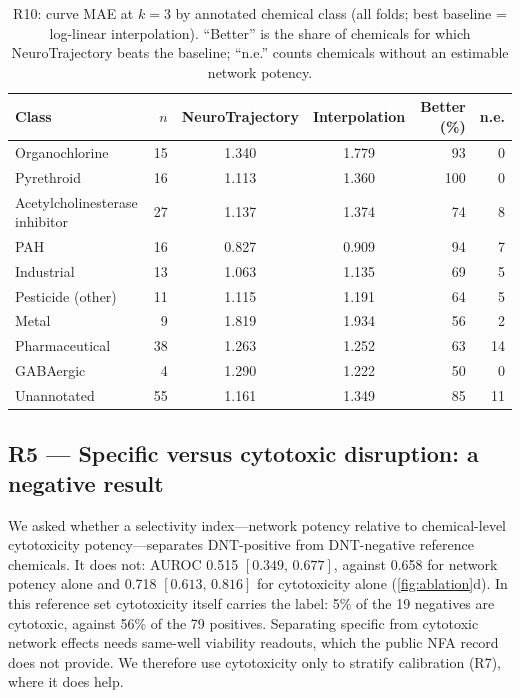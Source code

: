 \documentclass[11pt,a4paper]{article}
\newcommand{\NT}{NeuroTrajectory}
\newcommand{\ci}[2]{\ensuremath{[#1,\,#2]}}          %
\newcommand{\nPos}{79}
\newcommand{\nNeg}{19}
\begin{document}
\begin{table}[t]
\centering\footnotesize
\caption{R10: curve MAE at \(k=3\) by annotated chemical class (all folds; best baseline = log-linear
interpolation). ``Better'' is the share of chemicals for which \NT{} beats the baseline; ``n.e.'' counts
chemicals without an estimable network potency.}\label{tab:r10}
\begin{tabular}{@{}l r c c r r@{}}
\toprule
Class & \(n\) & \NT & Interpolation & Better (\%) & n.e. \\
\midrule
Organochlorine & 15 & 1.340 & 1.779 & 93 & 0 \\
Pyrethroid & 16 & 1.113 & 1.360 & 100 & 0 \\
Acetylcholinesterase inhibitor & 27 & 1.137 & 1.374 & 74 & 8 \\
PAH & 16 & 0.827 & 0.909 & 94 & 7 \\
Industrial & 13 & 1.063 & 1.135 & 69 & 5 \\
Pesticide (other) & 11 & 1.115 & 1.191 & 64 & 5 \\
Metal & 9 & 1.819 & 1.934 & 56 & 2 \\
Pharmaceutical & 38 & 1.263 & 1.252 & 63 & 14 \\
GABAergic & 4 & 1.290 & 1.222 & 50 & 0 \\
Unannotated & 55 & 1.161 & 1.349 & 85 & 11 \\
\bottomrule
\end{tabular}
\end{table}

\subsection{R5 --- Specific versus cytotoxic disruption: a negative result}\label{sec:r5}

We asked whether a selectivity index---network potency relative to chemical-level cytotoxicity potency---separates
DNT-positive from DNT-negative reference chemicals. It does not: AUROC
0.515 \ci{ 0.349 }{ 0.677 },
against 0.658 for network potency alone and
0.718 \ci{ 0.613 }{ 0.816 }
for cytotoxicity alone (\cref{fig:ablation}d). In this reference set cytotoxicity itself carries the label: 5\% of
the \nNeg{} negatives are cytotoxic, against 56\% of the
\nPos{} positives. Separating specific from
cytotoxic network effects needs same-well viability readouts, which the public NFA record does not provide. We
therefore use cytotoxicity only to stratify calibration (R7), where it does help.
\end{document}
